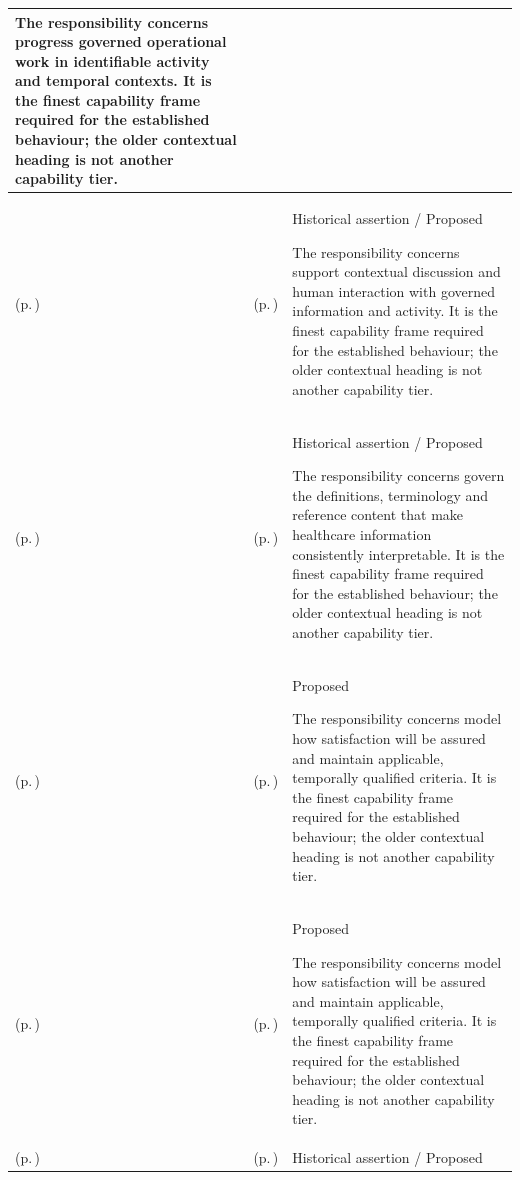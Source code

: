 \begin{longtable}{|>{\raggedright\arraybackslash}p{0.27\TableWidth}|>{\raggedright\arraybackslash}p{0.27\TableWidth}|>{\raggedright\arraybackslash}p{0.46\TableWidth}|}
The responsibility concerns progress governed operational work in identifiable activity and temporal contexts. It is the finest capability frame required for the established behaviour; the older contextual heading is not another capability tier.\\\hline
\nameref{cap:bec-collaborative-interaction-enablement} (p.\,\pageref{cap:bec-collaborative-interaction-enablement}) & \nameref{cap:bec-presentation-services} (p.\,\pageref{cap:bec-presentation-services}) & Historical assertion / Proposed

The responsibility concerns support contextual discussion and human interaction with governed information and activity. It is the finest capability frame required for the established behaviour; the older contextual heading is not another capability tier.\\\hline
\nameref{cap:bec-semantic-reference-knowledge-enablement} (p.\,\pageref{cap:bec-semantic-reference-knowledge-enablement}) & \nameref{cap:bec-information-design-governance} (p.\,\pageref{cap:bec-information-design-governance}) & Historical assertion / Proposed

The responsibility concerns govern the definitions, terminology and reference content that make healthcare information consistently interpretable. It is the finest capability frame required for the established behaviour; the older contextual heading is not another capability tier.\\\hline
\nameref{cap:bec-assurance-specification-enablement} (p.\,\pageref{cap:bec-assurance-specification-enablement}) & \nameref{cap:bec-assurance-design} (p.\,\pageref{cap:bec-assurance-design}) & Proposed

The responsibility concerns model how satisfaction will be assured and maintain applicable, temporally qualified criteria. It is the finest capability frame required for the established behaviour; the older contextual heading is not another capability tier.\\\hline
\nameref{cap:bec-assurance-specification-enablement} (p.\,\pageref{cap:bec-assurance-specification-enablement}) & \nameref{cap:bec-assurance-criteria-management} (p.\,\pageref{cap:bec-assurance-criteria-management}) & Proposed

The responsibility concerns model how satisfaction will be assured and maintain applicable, temporally qualified criteria. It is the finest capability frame required for the established behaviour; the older contextual heading is not another capability tier.\\\hline
\nameref{cap:bec-independent-assurance-evaluation-enablement} (p.\,\pageref{cap:bec-independent-assurance-evaluation-enablement}) & \nameref{cap:bec-governed-assurance} (p.\,\pageref{cap:bec-governed-assurance}) & Historical assertion / Proposed


\end{longtable}
